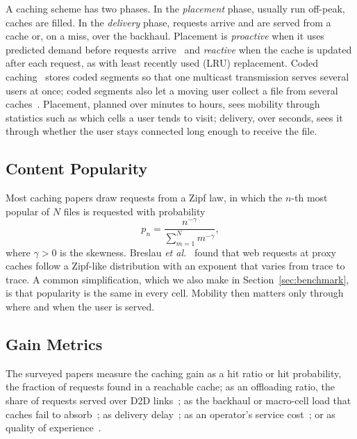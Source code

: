 A caching scheme has two phases. In the \emph{placement} phase, usually run off-peak, caches are filled. In the \emph{delivery} phase, requests arrive and are served from a cache or, on a miss, over the backhaul. Placement is \emph{proactive} when it uses predicted demand before requests arrive~\cite{bastug2014living,tadrous2016optimal} and \emph{reactive} when the cache is updated after each request, as with least recently used (LRU) replacement. Coded caching~\cite{maddahali2014fundamental} stores coded segments so that one multicast transmission serves several users at once; coded segments also let a moving user collect a file from several caches~\cite{poularakis2013exploiting,ozfatura2020mobility}. Placement, planned over minutes to hours, sees mobility through statistics such as which cells a user tends to visit; delivery, over seconds, sees it through whether the user stays connected long enough to receive the file.

\subsection{Content Popularity}
\label{subsec:popularity}

Most caching papers draw requests from a Zipf law, in which the $n$-th most popular of $N$ files is requested with probability
\begin{equation}
p_n = \frac{n^{-\gamma}}{\sum_{m=1}^{N} m^{-\gamma}},
\label{eq:zipf}
\end{equation}
where $\gamma>0$ is the skewness. Breslau \emph{et al.}~\cite{breslau1999web} found that web requests at proxy caches follow a Zipf-like distribution with an exponent that varies from trace to trace. A common simplification, which we also make in Section~\ref{sec:benchmark}, is that popularity is the same in every cell. Mobility then matters only through where and when the user is served.

\subsection{Gain Metrics}
\label{subsec:metrics}

The surveyed papers measure the caching gain as a hit ratio or hit probability, the fraction of requests found in a reachable cache; as an offloading ratio, the share of requests served over D2D links~\cite{wang2017mobility}; as the backhaul or macro-cell load that caches fail to absorb~\cite{poularakis2013exploiting,ozfatura2020mobility}; as delivery delay~\cite{alnagar2022mobility,krishnan2017mobility}; as an operator's service cost~\cite{tadrous2016optimal,hosny2016allerton}; or as quality of experience~\cite{chen2017sky}.

